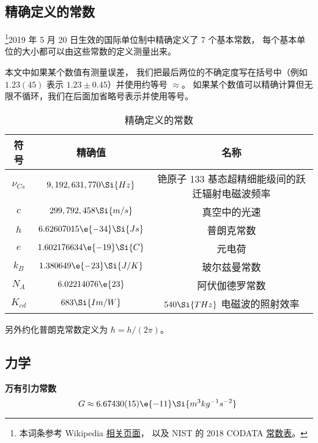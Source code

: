 

\subsection{精确定义的常数}
\footnote{本词条参考 Wikipedia \href{https://en.wikipedia.org/wiki/Physical_constant}{相关页面}， 以及 NIST 的 2018 CODATA \href{https://physics.nist.gov/cuu/Constants/Table/allascii.txt}{常数表}。}2019 年 5 月 20 日生效的国际单位制中精确定义了 7 个基本常数， 每个基本单位的大小都可以由这些常数的定义测量出来。

本文中如果某个数值有测量误差， 我们把最后两位的不确定度写在括号中（例如 $1.23(45)$ 表示 $1.23 \pm 0.45$）并使用约等号 $\approx$。 如果某个数值可以精确计算但无限不循环，我们在后面加省略号表示并使用等号。
\begin{table}[ht]
\centering
\caption{精确定义的常数}\label{tab_Consts_1}
\begin{tabular}{|c|c|c|}
\hline
符号 & 精确值 & 名称 \\
\hline
$\nu_{Cs}$ & $9,192,631,770\Si{Hz}$ & 铯原子 133 基态超精细能级间的跃迁辐射电磁波频率 \\
\hline
$c$ & $299,792,458\Si{m/s}$ & 真空中的光速 \\
\hline
$h$ & $6.62607015\e{-34}\Si{Js}$ & 普朗克常数 \\
\hline
$e$ & $1.602176634\e{-19}\Si{C} $ & 元电荷 \\
\hline
$k_B$ & $1.380649\e{-23} \Si{J/K}$ & 玻尔兹曼常数 \\
\hline
$N_A$ & $6.02214076\e{23} $ & 阿伏伽德罗常数 \\
\hline
$K_{cd}$ & $683\Si{Im/W}$ & $540\Si{THz}$ 电磁波的照射效率 \\
\hline
\end{tabular}
\end{table}
另外约化普朗克常数定义为 $\hbar = h/(2\pi)$。


\subsection{力学}
\textbf{万有引力常数}
\begin{equation}
G \approx 6.67430(15)\e{-11} \Si{m^3 kg^{-1} s^{-2}}~
\end{equation}

